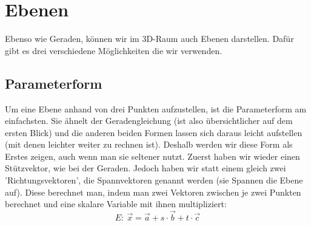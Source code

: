 \section{Ebenen}
Ebenso wie Geraden, können wir im 3D-Raum auch Ebenen darstellen. Dafür gibt es drei verschiedene Möglichkeiten die wir verwenden.

\subsection{Parameterform}
Um eine Ebene anhand von drei Punkten aufzustellen, ist die Parameterform am einfachsten. Sie ähnelt der Geradengleichung (ist also übersichtlicher auf dem ersten Blick) und die anderen beiden Formen lassen sich daraus leicht aufstellen (mit denen leichter weiter zu rechnen ist). Deshalb werden wir diese Form als Erstes zeigen, auch wenn man sie seltener nutzt. Zuerst haben wir wieder einen Stützvektor, wie bei der Geraden. Jedoch haben wir statt einem gleich zwei 'Richtungsvektoren', die Spannvektoren genannt werden (sie Spannen die Ebene auf). Diese berechnet man, indem man zwei Vektoren zwischen je zwei Punkten berechnet und eine skalare Variable mit ihnen multipliziert:
\[E:\ \vec{x}=\vec{a}+s\cdot \vec{b}+t\cdot \vec{c}\]

